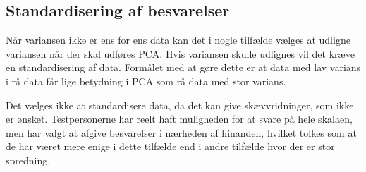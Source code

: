 \subsection{Standardisering af besvarelser}
Når variansen ikke er ens for ens data kan det i nogle tilfælde vælges at udligne variansen når der skal udføres PCA. Hvis variansen skulle udlignes vil det kræve en standardisering af data. Formålet med at gøre dette er at data med lav varians i rå data får lige betydning i PCA som rå data med stor varians. 

Det vælges ikke at standardisere data, da det kan give skævvridninger, som ikke er ønsket. Testpersonerne har reelt haft muligheden for at svare på hele skalaen, men har valgt at afgive besvarelser i nærheden af hinanden, hvilket tolkes som at de har været mere enige i dette tilfælde end i andre tilfælde hvor der er stor spredning. \blankline

%
